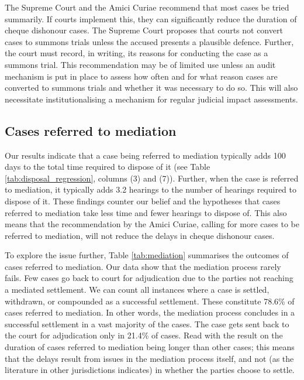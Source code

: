 \documentclass[12pt,a4paper]{article}
\begin{document}
The Supreme Court and the Amici Curiae recommend that most cases be tried summarily. If courts implement this, they can significantly reduce the duration of cheque dishonour cases. The Supreme Court proposes that courts not convert cases to summons trials unless the accused presents a plausible defence. Further, the court must record, in writing, its reasons for conducting the case as a summons trial. This recommendation may be of limited use unless an audit mechanism is put in place to assess how often and for what reason cases are converted to summons trials and whether it was necessary to do so. This will also necessitate institutionalising a mechanism for regular judicial impact assessments.

\subsection{Cases referred to mediation}
\label{sec:mediation}

Our results indicate that a case being referred to mediation typically adds 100 days to the total time required to dispose of it (see Table \ref{tab:disposal_regression}, columns (3) and (7)). Further, when the case is referred to mediation, it typically adds 3.2 hearings to the number of hearings required to dispose of it. These findings counter our belief and the hypotheses that cases referred to mediation take less time and fewer hearings to dispose of. This also means that the recommendation by the Amici Curiae, calling for more cases to be referred to mediation, will not reduce the delays in cheque dishonour cases.

To explore the issue further, Table \ref{tab:mediation} summarises the outcomes of cases referred to mediation. Our data show that the mediation process rarely fails. Few cases go back to court for adjudication due to the parties not reaching a mediated settlement. We can count all instances where a case is settled, withdrawn, or compounded as a successful settlement. These constitute 78.6\% of cases referred to mediation. In other words, the mediation process concludes in a successful settlement in a vast majority of the cases. The case gets sent back to the court for adjudication only in 21.4\% of cases. Read with the result on the duration of cases referred to mediation being longer than other cases; this means that the delays result from issues in the mediation process itself, and not (as the literature in other jurisdictions indicates) in whether the parties choose to settle.
\end{document}
